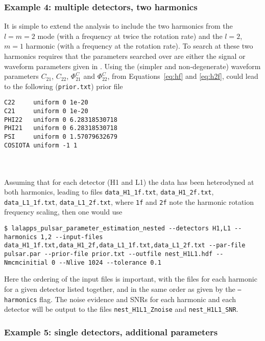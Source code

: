 \subsubsection{Example 4: multiple detectors, two harmonics}

It is simple to extend the analysis to include the two harmonics from the $l=m=2$ mode (with a \gw frequency at twice the rotation rate) and the $l=2$, $m=1$
harmonic (with a \gw frequency at the rotation rate). To search at these two harmonics requires that the parameters searched over are either the signal or
waveform parameters given in \citet{2015MNRAS.453.4399P}. Using the (simpler and non-degenerate) waveform parameters $C_{21}$, $C_{22}$, $\Phi_{21}^C$ and
$\Phi_{22}^C$, from Equations~\ref{eq:hf} and \ref{eq:h2f}, could lead to the following ({\tt prior.txt}) prior file
\begin{lrbox}{\Lst}
\begin{lstlisting}
C22     uniform 0 1e-20
C21     uniform 0 1e-20
PHI22   uniform 0 6.28318530718
PHI21   uniform 0 6.28318530718
PSI     uniform 0 1.57079632679
COSIOTA uniform -1 1
\end{lstlisting}
\end{lrbox}
\\[5pt] \indent \fbox{\usebox{\Lst}} \\[5pt]
Assuming that for each detector (H1 and L1) the data has been heterodyned at both harmonics, leading to files {\tt data\_H1\_1f.txt}, {\tt data\_H1\_2f.txt},
{\tt data\_L1\_1f.txt}, {\tt data\_L1\_2f.txt}, where {\tt 1f} and {\tt 2f} note the harmonic rotation frequency scaling, then one would use
\begin{lstlisting}[frame=single]
$ lalapps_pulsar_parameter_estimation_nested --detectors H1,L1 --harmonics 1,2 --input-files data_H1_1f.txt,data_H1_2f,data_L1_1f.txt,data_L1_2f.txt --par-file pulsar.par --prior-file prior.txt --outfile nest_H1L1.hdf --Nmcmcinitial 0 --Nlive 1024 --tolerance 0.1
\end{lstlisting}
Here the ordering of the input files is important, with the files for each harmonic for a given detector listed together, and in the same order as given by the
{\tt --harmonics} flag. The noise evidence and SNRs for each harmonic and each detector will be output to the files {\tt nest\_H1L1\_Znoise} and {\tt nest\_H1L1\_SNR}.

\subsubsection{Example 5: single detectors, additional parameters}

